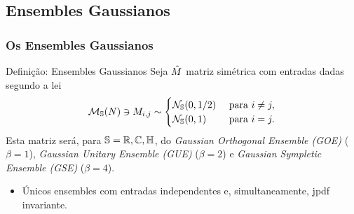 \subsection{Ensembles Gaussianos}
\begin{frame}	
\frametitle{Os Ensembles Gaussianos}

	\begin{block}{Definição: Ensembles Gaussianos}
		Seja $\hat M$ matriz simétrica com entradas dadas segundo a lei 
		\[
		\mathcal{M}_{\mathbb{S}}(N) \ni M_{i,j} \sim
		\begin{cases}
			\mathcal{N}_{\mathbb{S}}(0,1/2) &  \ \text{para} \ i \neq j,\\
			\mathcal{N}_{\mathbb{S}}(0,1) & \ \text{para} \ i = j.
		\end{cases}
		\]
		Esta matriz será, para $\mathbb{S} = \mathbb{R}, \mathbb{C}, \mathbb{H}$, do \textit{Gaussian Orthogonal Ensemble (GOE)} ($\beta=1$), \textit{Gaussian Unitary Ensemble (GUE)} ($\beta=2$) e \textit{Gaussian Sympletic Ensemble (GSE)} ($\beta=4$). 
	\end{block}

	\begin{itemize}
		\item Únicos ensembles com entradas independentes e, simultaneamente, jpdf invariante.
	\end{itemize}
\end{frame}
